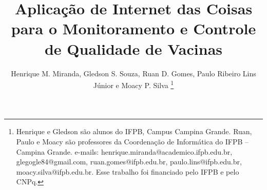 \documentclass{sbrt}
\begin{document}
\title{Aplicação de Internet das Coisas para o Monitoramento e Controle de Qualidade de Vacinas}

\author{Henrique M. Miranda, Gledson S. Souza, Ruan D. Gomes, Paulo Ribeiro Lins Júnior e Moacy P. Silva
\thanks{Henrique e Gledson são alunos do IFPB, Campus Campina Grande. Ruan, Paulo e Moacy são professores da Coordenação de Informática do IFPB -- Campina Grande. e-mails: henrique.miranda@academico.ifpb.edu.br, glegogle84@gmail.com, ruan.gomes@ifpb.edu.br, paulo.lins@ifpb.edu.br, moacy.silva@ifpb.edu.br. Esse trabalho foi financiado pelo IFPB e pelo CNPq.}
}

\maketitle







%


\end{document}
